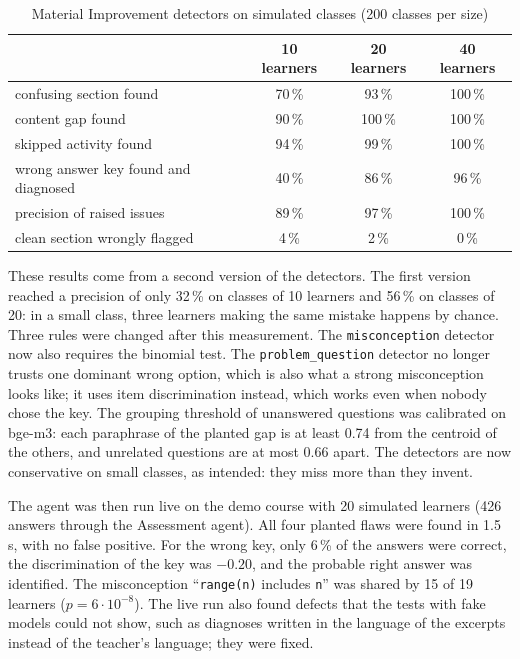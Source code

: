 \begin{table}[htbp]
\centering
\caption{Material Improvement detectors on simulated classes (200 classes per size)}
\label{tab-material-eval}
\small
\begin{tabular}{@{}lccc@{}}
\toprule
& \textbf{10 learners} & \textbf{20 learners} & \textbf{40 learners} \\
\midrule
confusing section found & 70\,\% & 93\,\% & 100\,\% \\
content gap found & 90\,\% & 100\,\% & 100\,\% \\
skipped activity found & 94\,\% & 99\,\% & 100\,\% \\
wrong answer key found and diagnosed & 40\,\% & 86\,\% & 96\,\% \\
precision of raised issues & 89\,\% & 97\,\% & 100\,\% \\
clean section wrongly flagged & 4\,\% & 2\,\% & 0\,\% \\
\bottomrule
\end{tabular}
\end{table}

These results come from a second version of the detectors. The first
version reached a precision of only 32\,\% on classes of 10 learners and
56\,\% on classes of 20: in a small class, three learners making the same
mistake happens by chance. Three rules were changed after this
measurement. The \texttt{misconception} detector now also requires the
binomial test. The \texttt{problem\_question} detector no longer trusts
one dominant wrong option, which is also what a strong misconception
looks like; it uses item discrimination instead, which works even when
nobody chose the key. The grouping threshold of unanswered questions was
calibrated on bge-m3: each paraphrase of the planted gap is at least 0.74
from the centroid of the others, and unrelated questions are at most 0.66
apart. The detectors are now conservative on small classes, as intended:
they miss more than they invent.

The agent was then run live on the demo course with 20 simulated learners
(426 answers through the Assessment agent). All four planted flaws were
found in 1.5\,s, with no false positive. For the wrong key, only 6\,\% of
the answers were correct, the discrimination of the key was $-0.20$, and
the probable right answer was identified. The misconception ``\texttt{range(n)}
includes \texttt{n}'' was shared by 15 of 19 learners ($p = 6 \cdot 10^{-8}$).
The live run also found defects that the tests with fake models could not
show, such as diagnoses written in the language of the excerpts instead
of the teacher's language; they were fixed.

